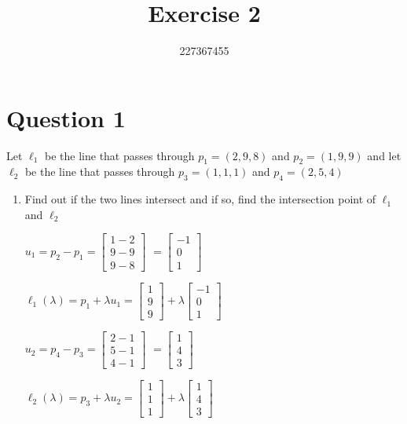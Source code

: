 \documentclass{article}
\begin{document}
    \title{Exercise 2}
    \author{227367455}
    \date{}
    \maketitle

    \section*{Question 1}
    Let $\ell_1$ be the line that passes through $p_1=(2,9,8)$ and $p_2=(1,9,9)$ 
    and let $\ell_2$ be the line that passes through $p_3=(1,1,1)$ and $p_4=(2,5,4)$
    \begin{enumerate}
        \item Find out if the two lines intersect and if so, find the intersection point of $\ell_1$ and $\ell_2$
        
        $u_1 = p_2 - p_1 = \begin{bmatrix} 1 - 2 \\ 9 - 9 \\ 9 - 8 \end{bmatrix}$
        $ = \begin{bmatrix} -1 \\ 0 \\ 1 \end{bmatrix}$

        $\ell_1(\lambda) = p_1 + \lambda u_1 = \begin{bmatrix} 1 \\ 9 \\ 9 \end{bmatrix} + \lambda \begin{bmatrix} -1 \\ 0 \\ 1 \end{bmatrix}$

        $u_2 = p_4 - p_3 = \begin{bmatrix} 2 - 1 \\ 5 - 1 \\ 4 - 1 \end{bmatrix}$
        $ = \begin{bmatrix} 1 \\ 4 \\ 3 \end{bmatrix}$

        $\ell_2(\lambda) = p_3 + \lambda u_2 = \begin{bmatrix} 1 \\ 1 \\ 1 \end{bmatrix} + \lambda \begin{bmatrix} 1 \\ 4 \\ 3 \end{bmatrix}$


\end{enumerate}
\end{document}
